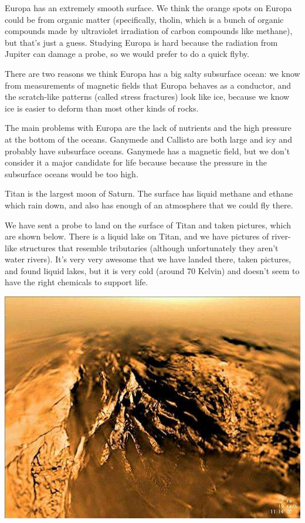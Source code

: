 \documentclass[class=article, crop=false]{standalone}
\begin{document}
Europa has an extremely smooth surface. We think the orange spots on Europa could be from organic matter (specifically, tholin, which is a bunch of organic compounds made by ultraviolet irradiation of carbon compounds like methane), but that's just a guess. Studying Europa is hard because the radiation from Jupiter can damage a probe, so we would prefer to do a quick flyby.
\par
There are two reasons we think Europa has a big salty subsurface ocean: we know from measurements of magnetic fields that Europa behaves as a conductor, and the scratch-like patterns (called stress fractures) look like ice, because we know ice is easier to deform than most other kinds of rocks.
\par
The main problems with Europa are the lack of nutrients and the high pressure at the bottom of the oceans.
Ganymede and Callisto are both large and icy and probably have subsurface oceans. Ganymede has a magnetic field, but we don't consider it a major candidate for life because because the pressure in the subsurface oceans would be too high.
\par
Titan is the largest moon of Saturn. The surface has liquid methane and ethane which rain down, and also has enough of an atmosphere that we could fly there.
\par
We have sent a probe to land on the surface of Titan and taken pictures, which are shown below. There is a liquid lake on Titan, and we have pictures of river-like structures that resemble tributaries (although unfortunately they aren't water rivers). It's very very awesome that we have landed there, taken pictures, and found liquid lakes, but it is very cold (around 70 Kelvin) and doesn't seem to have the right chemicals to support life.
\begin{center}
    \includegraphics[width=.8\textwidth]{titan1.jpg}
\end{center}
\end{document}
